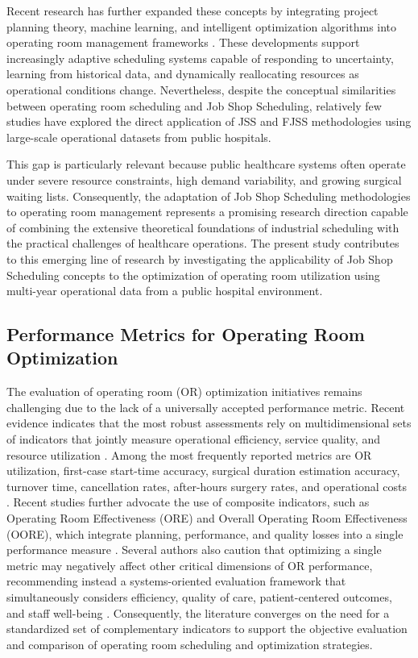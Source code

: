 \documentclass[sn-mathphys-num]{sn-jnl}
\begin{document}
    Recent research has further expanded these concepts by integrating project planning theory, machine learning, and intelligent optimization algorithms into operating room management frameworks \cite{chamarthi2025,zhao2025}. These developments support increasingly adaptive scheduling systems capable of responding to uncertainty, learning from historical data, and dynamically reallocating resources as operational conditions change. Nevertheless, despite the conceptual similarities between operating room scheduling and Job Shop Scheduling, relatively few studies have explored the direct application of JSS and FJSS methodologies using large-scale operational datasets from public hospitals.
    
    This gap is particularly relevant because public healthcare systems often operate under severe resource constraints, high demand variability, and growing surgical waiting lists. Consequently, the adaptation of Job Shop Scheduling methodologies to operating room management represents a promising research direction capable of combining the extensive theoretical foundations of industrial scheduling with the practical challenges of healthcare operations. The present study contributes to this emerging line of research by investigating the applicability of Job Shop Scheduling concepts to the optimization of operating room utilization using multi-year operational data from a public hospital environment.
    
    \subsection*{Performance Metrics for Operating Room Optimization}

    The evaluation of operating room (OR) optimization initiatives remains challenging due to the lack of a universally accepted performance metric. Recent evidence indicates that the most robust assessments rely on multidimensional sets of indicators that jointly measure operational efficiency, service quality, and resource utilization \cite{Schouten2023,Charlesworth2020}. Among the most frequently reported metrics are OR utilization, first-case start-time accuracy, surgical duration estimation accuracy, turnover time, cancellation rates, after-hours surgery rates, and operational costs \cite{Fixler2013,Reeves2020,Negash2022,Sibhatu2024}. Recent studies further advocate the use of composite indicators, such as Operating Room Effectiveness (ORE) and Overall Operating Room Effectiveness (OORE), which integrate planning, performance, and quality losses into a single performance measure \cite{Souza2020,Sonmez2020}. Several authors also caution that optimizing a single metric may negatively affect other critical dimensions of OR performance, recommending instead a systems-oriented evaluation framework that simultaneously considers efficiency, quality of care, patient-centered outcomes, and staff well-being \cite{Basson2018,Schouten2023}. Consequently, the literature converges on the need for a standardized set of complementary indicators to support the objective evaluation and comparison of operating room scheduling and optimization strategies.
 
\end{document}
